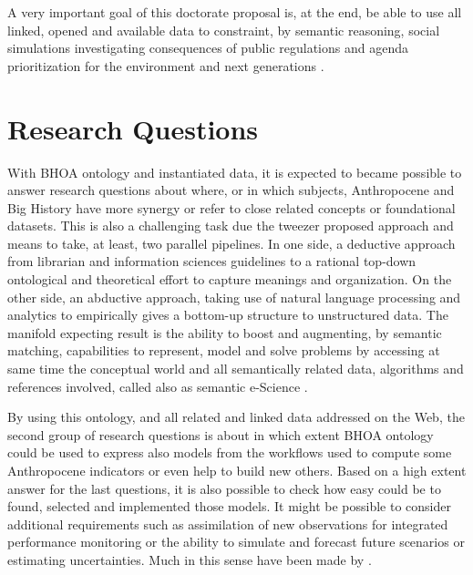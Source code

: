 \documentclass[
	12pt, %
	a4paper, %
	oneside, %
	headinclude, footinclude, %
	BCOR5mm, %
]{scrartcl}
\begin{document}
A very important goal of this doctorate proposal is, at the end, be able to use all linked, opened and available data to constraint, by semantic reasoning, social simulations investigating consequences of public regulations and agenda prioritization for the environment and next generations \citep{biermann_navigating_2012}.

\section{Research Questions}

With BHOA ontology and instantiated data, it is expected to became possible to answer research questions about where, or in which subjects, Anthropocene and Big History have more synergy or refer to close related concepts or foundational datasets. This is also a challenging task due the tweezer proposed approach and means to take, at least, two parallel pipelines. In one side, a deductive approach from librarian and information sciences guidelines to a rational top-down ontological and theoretical effort to capture meanings and organization. On the other side, an abductive approach, taking use of natural language processing and analytics to empirically gives a bottom-up structure to unstructured data. The manifold expecting result is the ability to boost and augmenting, by semantic matching, capabilities to represent, model and solve problems by accessing at same time the conceptual world and all semantically related data, algorithms and references involved, called also as semantic e-Science \citep{narock_science_2012,ma_semantic_2015}.

By using this ontology, and all related and linked data addressed on the Web, the second group of research questions is about in which extent BHOA ontology could be used to express also models from the workflows used to compute some Anthropocene indicators or even help to build new others. Based on a high extent answer for the last questions, it is also possible to check how easy could be to found, selected and implemented those models. It might be possible to consider additional requirements such as assimilation of new observations for integrated performance monitoring or the ability to simulate and forecast future scenarios or estimating uncertainties. Much in this sense have been made by \cite{biermann_navigating_2012}.
\end{document}
